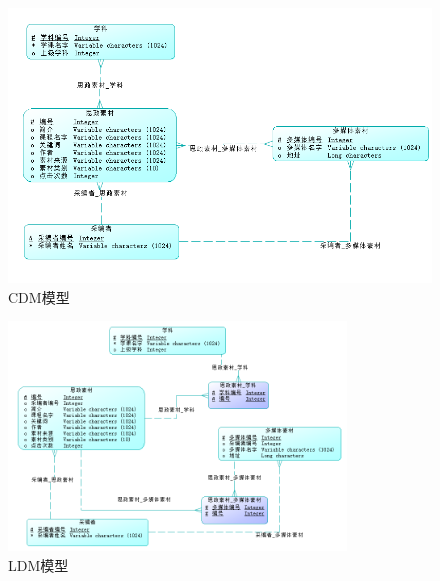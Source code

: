 \documentclass[11pt]{article}
\begin{document}
  \begin{figure}[h]
    \centering
    \includegraphics[width=\textwidth]{CDM模型.png}
    \caption{CDM模型}
    \label{tab:CDMmodel}
  \end{figure}

  \begin{figure}[p]
    \centering
    \includegraphics[width=0.8\textwidth]{LDM模型.png}
    \caption{LDM模型}
    \label{tab:LDMmodel}
  \end{figure}
\end{document}
